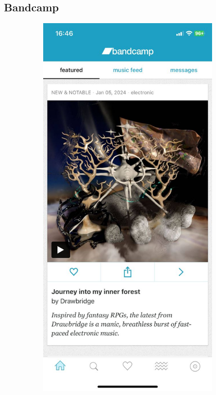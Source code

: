 \subsection{Bandcamp}
\begin{figure} [h]
    \centering
    \begin{subfigure}{.3\linewidth}
      \centering
      \includegraphics[width = \linewidth]{mainmatter/images/bandcamp1.jpg}

\end{subfigure}
\end{figure}
